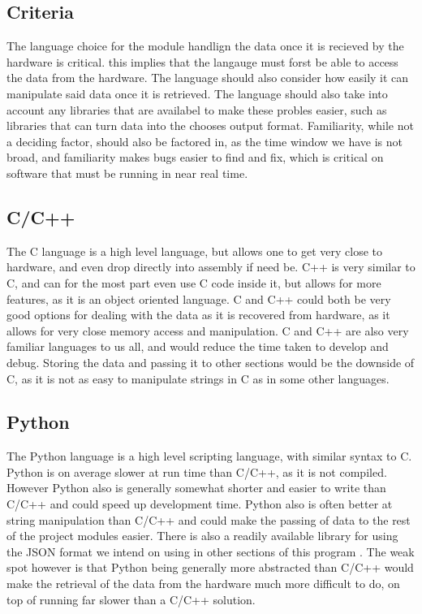 \documentclass[onecolumn, draftclsnofoot,10pt, compsoc]{IEEEtran}
\begin{document}
\subsection{Criteria}
The language choice for the module handlign the data once it is recieved by the hardware is critical. this implies that the langauge must forst be able to access the data from the hardware. The language should also consider how easily it can manipulate said data once it is retrieved. The language should also take into account any libraries that are availabel to make these probles easier, such as libraries that can turn data into the chooses output format. Familiarity, while not a deciding factor, should also be factored in, as the time window we have is not broad, and familiarity makes bugs easier to find and fix, which is critical on software that must be running in near real time. 
\subsection{C/C++}
The C language is a high level language, but allows one to get very close to hardware, and even drop directly into assembly if need be. C++ is very similar to C, and can for the most part even use C code inside it, but allows for more features, as it is an object oriented language. C and C++ could both be very good options for dealing with the data as it is recovered from hardware, as it allows for very close memory access and manipulation. C and C++ are also very familiar languages to us all, and would reduce the time taken to develop and debug. Storing the data and passing it to other sections would be the downside of C, as it is not as easy to manipulate strings in C as in some other languages.
\subsection{Python}
The Python language is a high level scripting language, with similar syntax to C. Python is on average slower at run time than C/C++, as it is not compiled. However Python also is generally somewhat shorter and easier to write than C/C++ and could speed up development time. Python also is often better at string manipulation than C/C++ and could make the passing of data to the rest of the project modules easier. There is also a readily available library for using the JSON format we intend on using in other sections of this program \cite{refpython}. The weak spot however is that Python being generally more abstracted than C/C++ would make the retrieval of the data from the hardware much more difficult to do, on top of running far slower than a C/C++ solution.
\end{document}
